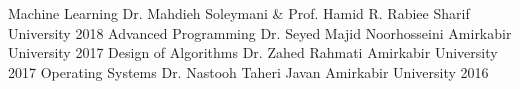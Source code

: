 

\begin{cvhonors}
	\cvhonor
	{Machine Learning} %
	{Dr. Mahdieh Soleymani \& Prof. Hamid R. Rabiee} %
	{Sharif University} %
	{2018} %
	\cvhonor
	{Advanced Programming} %
	{Dr. Seyed Majid Noorhosseini} %
	{Amirkabir University} %
	{2017} %
	\cvhonor
	{Design of Algorithms} %
	{Dr. Zahed Rahmati} %
	{Amirkabir University} %
	{2017} %
	\cvhonor
	{Operating Systems} %
	{Dr. Nastooh Taheri Javan} %
	{Amirkabir University} %
	{2016} %
\end{cvhonors}